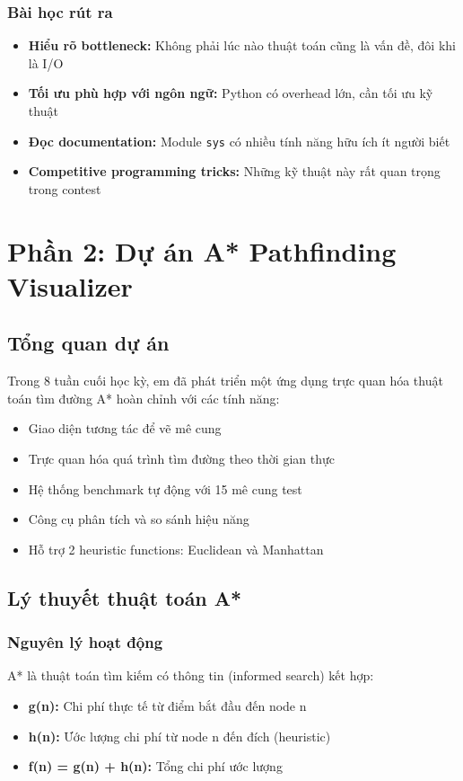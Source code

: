 \documentclass[12pt,a4paper]{article}
\begin{document}
\subsubsection{Bài học rút ra}
\begin{itemize}
    \item \textbf{Hiểu rõ bottleneck:} Không phải lúc nào thuật toán cũng là vấn đề, đôi khi là I/O
    \item \textbf{Tối ưu phù hợp với ngôn ngữ:} Python có overhead lớn, cần tối ưu kỹ thuật
    \item \textbf{Đọc documentation:} Module \texttt{sys} có nhiều tính năng hữu ích ít người biết
    \item \textbf{Competitive programming tricks:} Những kỹ thuật này rất quan trọng trong contest
\end{itemize}

\newpage
\section{Phần 2: Dự án A* Pathfinding Visualizer}

\subsection{Tổng quan dự án}
Trong 8 tuần cuối học kỳ, em đã phát triển một ứng dụng trực quan hóa thuật toán tìm đường A* hoàn chỉnh với các tính năng:
\begin{itemize}
    \item Giao diện tương tác để vẽ mê cung
    \item Trực quan hóa quá trình tìm đường theo thời gian thực
    \item Hệ thống benchmark tự động với 15 mê cung test
    \item Công cụ phân tích và so sánh hiệu năng
    \item Hỗ trợ 2 heuristic functions: Euclidean và Manhattan
\end{itemize}

\subsection{Lý thuyết thuật toán A*}

\subsubsection{Nguyên lý hoạt động}
A* là thuật toán tìm kiếm có thông tin (informed search) kết hợp:
\begin{itemize}
    \item \textbf{g(n):} Chi phí thực tế từ điểm bắt đầu đến node n
    \item \textbf{h(n):} Ước lượng chi phí từ node n đến đích (heuristic)
    \item \textbf{f(n) = g(n) + h(n):} Tổng chi phí ước lượng
\end{itemize}
\end{document}
